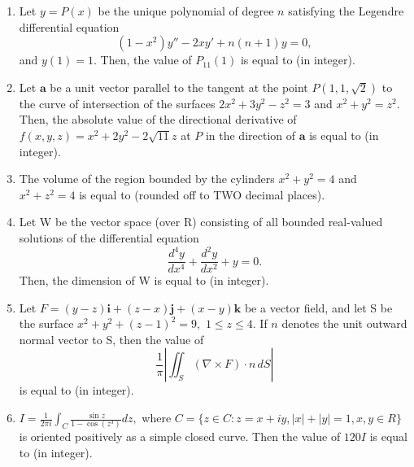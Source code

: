 \documentclass[journal,12pt,onecolumn]{IEEEtran}
\theoremstyle{remark}
\begin{document}
\begin{enumerate}
\hfill{}

\item Let $y = P(x)$ be the unique polynomial of degree $n$ satisfying the Legendre differential equation  
\[
(1-x^2)y'' - 2xy' + n(n+1)y = 0,
\]  
and $y(1)=1$.  
Then, the value of $P_{11}(1)$ is equal to \underline{\hspace{2cm}} (in integer).  

\hfill{}

\item Let $\mathbf{a}$ be a unit vector parallel to the tangent at the point $P(1,1,\sqrt{2})$ to the curve of intersection of the surfaces $2x^2+3y^2-z^2=3$ and $x^2+y^2=z^2$.  
Then, the absolute value of the directional derivative of $f(x,y,z)=x^2+2y^2-2\sqrt{11}z$ at $P$ in the direction of $\mathbf{a}$ is equal to \underline{\hspace{2cm}} (in integer).  

\hfill{}

\item The volume of the region bounded by the cylinders $x^2+y^2=4$ and $x^2+z^2=4$ is equal to \underline{\hspace{2cm}} (rounded off to TWO decimal places).  

\hfill{}

\item Let W be the vector space (over R) consisting of all bounded real-valued solutions of the differential equation  
$$
\frac{d^4y}{dx^4} + \frac{d^2y}{dx^2} + y = 0.
$$  
Then, the dimension of W is equal to \underline{\hspace{2cm}} (in integer).  

\hfill{}

\item Let $F=(y-z)\mathbf{i}+(z-x)\mathbf{j}+(x-y)\mathbf{k}$ be a vector field, and let S be the surface $x^2+y^2+(z-1)^2=9,$ $1\leq z\leq 4$.  
If $n$ denotes the unit outward normal vector to S, then the value of  
$$
\frac{1}{\pi}\left|\iint_S (\nabla\times F)\cdot n \, dS\right|
$$  
is equal to \underline{\hspace{2cm}} (in integer).  

\hfill{}

\item $I = \frac{1}{2\pi i}\int_C \frac{\sin z}{1-\cos(z^3)}dz,$  
where $C = \{z \in C : z= x+iy, |x|+|y|=1, x,y \in R\}$ is oriented positively as a simple closed curve. Then the value of $120I$ is equal to \underline{\hspace{2cm}} (in integer).  


\end{enumerate}
\end{document}
